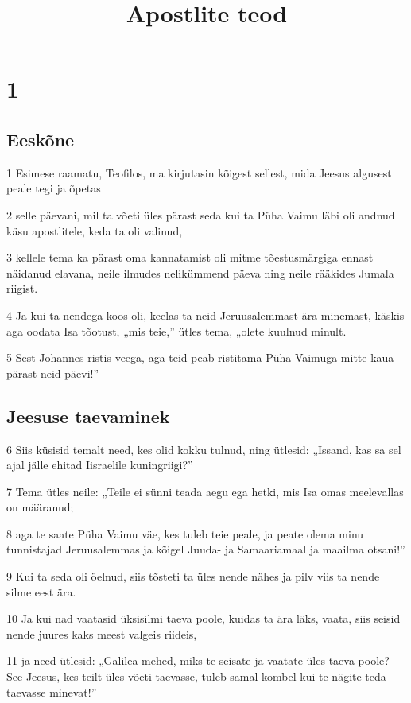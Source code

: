 

\title{Apostlite teod}

\chapter{1}

\section*{Eeskõne}

\par 1 Esimese raamatu, Teofilos, ma kirjutasin kõigest sellest, mida Jeesus algusest peale tegi ja õpetas
\par 2 selle päevani, mil ta võeti üles pärast seda kui ta Püha Vaimu läbi oli andnud käsu apostlitele, keda ta oli valinud,
\par 3 kellele tema ka pärast oma kannatamist oli mitme tõestusmärgiga ennast näidanud elavana, neile ilmudes nelikümmend päeva ning neile rääkides Jumala riigist.
\par 4 Ja kui ta nendega koos oli, keelas ta neid Jeruusalemmast ära minemast, käskis aga oodata Isa tõotust, „mis teie,” ütles tema, „olete kuulnud minult.
\par 5 Sest Johannes ristis veega, aga teid peab ristitama Püha Vaimuga mitte kaua pärast neid päevi!”

\section*{Jeesuse taevaminek}

\par 6 Siis küsisid temalt need, kes olid kokku tulnud, ning ütlesid: „Issand, kas sa sel ajal jälle ehitad Iisraelile kuningriigi?”
\par 7 Tema ütles neile: „Teile ei sünni teada aegu ega hetki, mis Isa omas meelevallas on määranud;
\par 8 aga te saate Püha Vaimu väe, kes tuleb teie peale, ja peate olema minu tunnistajad Jeruusalemmas ja kõigel Juuda- ja Samaariamaal ja maailma otsani!”
\par 9 Kui ta seda oli öelnud, siis tõsteti ta üles nende nähes ja pilv viis ta nende silme eest ära.
\par 10 Ja kui nad vaatasid üksisilmi taeva poole, kuidas ta ära läks, vaata, siis seisid nende juures kaks meest valgeis riideis,
\par 11 ja need ütlesid: „Galilea mehed, miks te seisate ja vaatate üles taeva poole? See Jeesus, kes teilt üles võeti taevasse, tuleb samal kombel kui te nägite teda taevasse minevat!”

